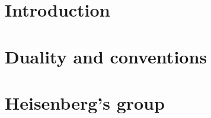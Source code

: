 %

\chapter*{Introduction}
    


\chapter{Duality and conventions}
    

\chapter{Heisenberg's group}
    